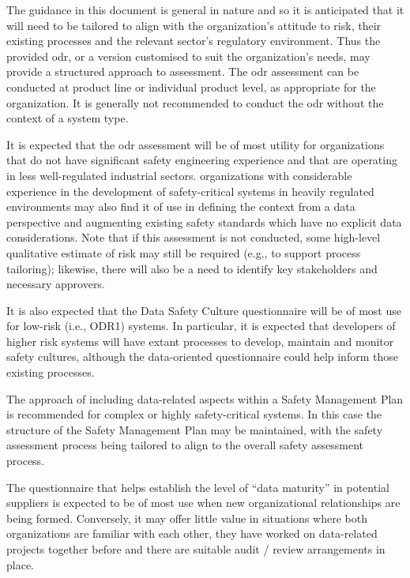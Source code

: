 The guidance in this document is general in nature and so it is anticipated that it will need to be tailored to align with the organization's attitude to risk, their existing processes and the relevant sector's regulatory environment. Thus the provided \gls{odr}, or a version customised to suit the organization's needs, may provide a structured approach to assessment.
The \gls{odr} assessment can be conducted at product line or individual product level, as appropriate for the organization. It is generally not recommended to conduct the \gls{odr} without the context of a system type.

It is expected that the \gls{odr} assessment will be of most utility for organizations that do not have significant safety engineering experience and that are operating in less well-regulated industrial sectors.
organizations with considerable experience in the development of safety-critical systems in heavily regulated environments
may also find it of use in defining the context from a data perspective and augmenting existing safety standards which have no explicit data considerations.
Note that if this assessment is not conducted, some high-level qualitative estimate of risk may still be required (e.g., to support process tailoring); likewise, there will also be a need to identify key \glspl{stakeholder} and necessary approvers.

It is also expected that the Data Safety Culture questionnaire will be of most use for low-risk (i.e., ODR1) systems. In particular, it is expected that developers of higher risk systems will have extant processes to develop, maintain and monitor safety cultures,
although the data-oriented questionnaire could help inform those existing processes.

The approach of including data-related aspects within a Safety Management Plan is recommended for complex or highly safety-critical systems. In this case the structure of the Safety Management Plan may be maintained, with the \gls{safety assessment} process being tailored to align to the overall safety assessment process.

The questionnaire that helps establish the level of ``data maturity'' in potential suppliers is expected to be of most use when new organizational relationships are being formed. Conversely, it may offer little value in situations where both organizations are familiar with each other, they have worked on data-related projects together before and there are suitable audit / review arrangements in place.

